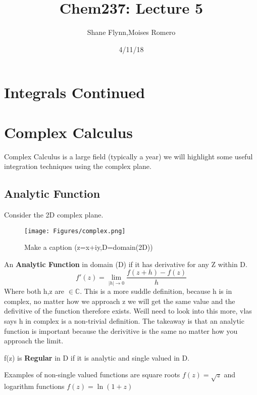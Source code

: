 \documentclass{article}
\title{Chem237: Lecture 5}
\date{4/11/18}
\author{Shane Flynn,Moises Romero}
\newcommand{\be}{\begin{equation}}
\newcommand{\ee}{\end{equation}}
\begin{document}
\maketitle
\section*{Integrals Continued}
\section*{Complex Calculus }
Complex Calculus is a large field (typically a year) we will highlight some useful integration techniques using the complex plane. 

\subsection*{Analytic Function}
Consider the 2D complex plane. 
\begin{figure}[h]
  \centering
  \texttt{[image: Figures/complex.png]}
    \caption{Make a caption (z=x+iy,D=domain(2D))}
  \label{fig:under_damped}
\end{figure}
An \textbf{Analytic Function} in domain (D) if it has derivative for any Z within D.
\be
f'(z) = \lim_{|h|\to 0} \frac{f(z+h)-f(z)}{h}
\ee
Where both h,z are $\in \mathbb{C}$. This is a more suddle definition, because h is in complex, no matter how we approach z we will get the same value and the defivitive of the function therefore exists. Weill need to look into this more, vlas says h in complex is a non-trivial definition. 
The takeaway is that an analytic function is important because the derivitive is the same no matter how you approach the limit. 

f(z) is \textbf{Regular} in D if it is analytic and single valued in D.

Examples of non-single valued functions are square roots
$f(z) = \sqrt{z}$ and logarithm functions $f(z)=\ln{(1+z)}$
\end{document}

